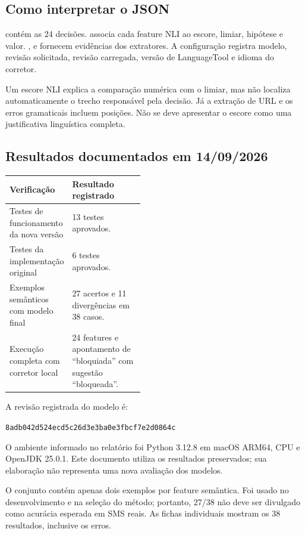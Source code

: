 \clearpage
\subsection{Como interpretar o JSON}
 contém as 24 decisões.  associa cada feature NLI ao escore, limiar, hipótese e valor. ,  e  fornecem evidências dos extratores. A configuração registra modelo, revisão solicitada, revisão carregada, versão de LanguageTool e idioma do corretor.

Um escore NLI explica a comparação numérica com o limiar, mas não localiza automaticamente o trecho responsável pela decisão. Já a extração de URL e os erros gramaticais incluem posições. Não se deve apresentar o escore como uma justificativa linguística completa.

\subsection{Resultados documentados em 14/09/2026}
\begin{tabularx}{\linewidth}{@{}p{0.45\linewidth}X@{}}
\toprule
\textbf{Verificação} & \textbf{Resultado registrado} \\
\midrule
Testes de funcionamento da nova versão & 13 testes aprovados. \\
Testes da implementação original & 6 testes aprovados. \\
Exemplos semânticos com modelo final & 27 acertos e 11 divergências em 38 casos. \\
Execução completa com corretor local & 24 features e apontamento de ``bloquiada'' com sugestão ``bloqueada''. \\
\bottomrule
\end{tabularx}

A revisão registrada do modelo é:\par
\small\nolinkurl{8adb042d524ecd5c26d3e3ba0e3fbcf7e2d0864c}\normalsize\par
O ambiente informado no relatório foi Python 3.12.8 em macOS ARM64, CPU e OpenJDK 25.0.1. Este documento utiliza os resultados preservados; sua elaboração não representa uma nova avaliação dos modelos.

\begin{caixaatencao}
O conjunto contém apenas dois exemplos por feature semântica. Foi usado no desenvolvimento e na seleção do método; portanto, 27/38 não deve ser divulgado como acurácia esperada em SMS reais. As fichas individuais mostram os 38 resultados, inclusive os erros.
\end{caixaatencao}

